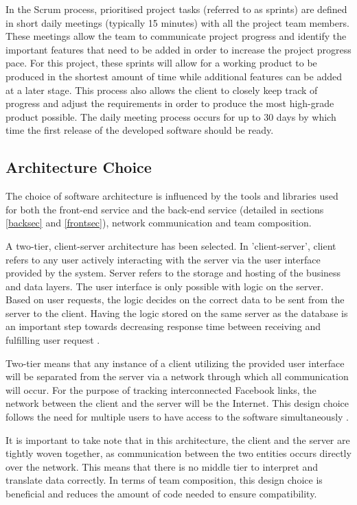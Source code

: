 \documentclass[12pt,onecolumn]{article}
\begin{document}
	In the Scrum process, prioritised project tasks (referred to as sprints) are defined in short daily meetings (typically 15 minutes) with all the project team members. These meetings allow the team to communicate project progress and identify the important features that need to be added in order to increase the project progress pace. For this project, these sprints will allow for a working product to be produced in the shortest amount of time while additional features can be  added at a later stage. This process also allows the client to closely keep track of progress and adjust the requirements in order to produce the most high-grade product possible. The daily meeting process occurs for up to 30 days by which time the first release of the developed software should be ready.   
	
	
	\subsection{Architecture Choice}
	The choice of software architecture is influenced by the tools and libraries used for both the front-end service and the back-end service (detailed in sections \ref{backsec} and \ref{frontsec}), network communication and team composition. 
	
	A two-tier, client-server architecture has been selected. In 'client-server', client refers to any user actively interacting with the server via the user interface provided by the system. Server refers to the storage and hosting of the business and data layers. The user interface is only possible with logic on the server. Based on user requests, the logic decides on the correct data to be sent from the server to the client. Having the logic stored on the same server as the database is an important step towards decreasing response time between receiving and fulfilling user request \cite{twotieradvantage}. 
	
	Two-tier means that any instance of a client utilizing the provided user interface will be separated from the server via a network through which all communication will occur. For the purpose of tracking interconnected Facebook links, the network between the client and the server will be the Internet. This design choice follows the need for multiple users to have access to the software simultaneously \cite{beginningsofteng}. 
	
	It is important to take note that in this architecture, the client and the server are tightly woven together, as communication between the two entities occurs directly over the network. This means that there is no middle tier to interpret and translate data correctly. In terms of team composition, this design choice is beneficial and reduces the amount of code needed to ensure compatibility.
	
\end{document}
